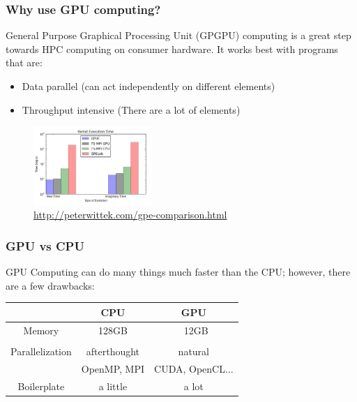 \documentclass{beamer}
\begin{document}
\begin{frame}
\frametitle{Why use GPU computing?}

General Purpose Graphical Processing Unit (GPGPU) computing is a great step towards HPC computing on consumer hardware. It works best with programs that are:
\begin{itemize}
\item Data parallel (can act independently on different elements)
\item Throughput intensive (There are a lot of elements)
\end{itemize}

\begin{figure}
\begin{center}
\includegraphics[width=0.4\textwidth]{GPUE_BENCHMARKS.jpg}
\end{center}
\caption{\url{http://peterwittek.com/gpe-comparison.html}}
\end{figure}
\end{frame}

\begin{frame}
\frametitle{GPU vs CPU}
GPU Computing can do many things much faster than the CPU; however, there are a few drawbacks:
\begin{center}
\begin{tabular}{c | c | c}
& CPU & GPU \\
\hline
Memory & 128GB & ~12GB \\
& & \\
Parallelization & afterthought & natural \\
& OpenMP, MPI & CUDA, OpenCL...\\
Boilerplate & a little & a lot\\

\end{tabular}
\end{center}
\end{frame}
\end{document}
